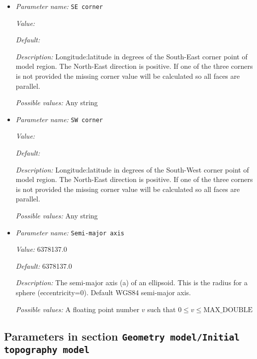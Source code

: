 \begin{itemize}
{\it Possible values:} An integer $n$ such that $0\leq n \leq 2147483647$
\item {\it Parameter name:} {\tt SE corner}
\label{parameters:Geometry model/Ellipsoidal chunk/SE corner}
\label{parameters:Geometry_20model/Ellipsoidal_20chunk/SE_20corner}


{\it Value:} 


{\it Default:} 


{\it Description:} Longitude:latitude in degrees of the South-East corner point of model region. The North-East direction is positive. If one of the three corners is not provided the missing corner value will be calculated so all faces are parallel.


{\it Possible values:} Any string
\item {\it Parameter name:} {\tt SW corner}
\label{parameters:Geometry model/Ellipsoidal chunk/SW corner}
\label{parameters:Geometry_20model/Ellipsoidal_20chunk/SW_20corner}


{\it Value:} 


{\it Default:} 


{\it Description:} Longitude:latitude in degrees of the South-West corner point of model region. The North-East direction is positive. If one of the three corners is not provided the missing corner value will be calculated so all faces are parallel.


{\it Possible values:} Any string
\item {\it Parameter name:} {\tt Semi-major axis}
\label{parameters:Geometry model/Ellipsoidal chunk/Semi_2dmajor axis}
\label{parameters:Geometry_20model/Ellipsoidal_20chunk/Semi_2dmajor_20axis}


{\it Value:} 6378137.0


{\it Default:} 6378137.0


{\it Description:} The semi-major axis (a) of an ellipsoid. This is the radius for a sphere (eccentricity=0). Default WGS84 semi-major axis.


{\it Possible values:} A floating point number $v$ such that $0 \leq v \leq \text{MAX\_DOUBLE}$
\end{itemize}

\subsection{Parameters in section \tt Geometry model/Initial topography model}
\label{parameters:Geometry_20model/Initial_20topography_20model}

